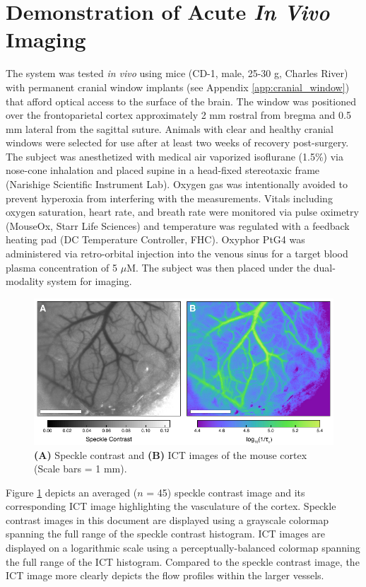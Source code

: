 \section{Demonstration of Acute \textit{In Vivo} Imaging} \label{sec:acutedemo}

The system was tested \textit{in vivo} using mice (CD-1, male, 25-30 g, Charles River) with permanent cranial window implants (see Appendix \ref{app:cranial_window}) that afford optical access to the surface of the brain. The window was positioned over the frontoparietal cortex approximately 2 mm rostral from bregma and 0.5 mm lateral from the sagittal suture. Animals with clear and healthy cranial windows were selected for use after at least two weeks of recovery post-surgery. The subject was anesthetized with medical air vaporized isoflurane (1.5\%) via nose-cone inhalation and placed supine in a head-fixed stereotaxic frame (Narishige Scientific Instrument Lab). Oxygen gas was intentionally avoided to prevent hyperoxia from interfering with the  measurements. Vitals including oxygen saturation, heart rate, and breath rate were monitored via pulse oximetry (MouseOx, Starr Life Sciences) and temperature was regulated with a feedback heating pad (DC Temperature Controller, FHC). Oxyphor PtG4 was administered via retro-orbital injection into the venous sinus for a target blood plasma concentration of 5 $\mu$M. The subject was then placed under the dual-modality system for imaging.

\begin{figure}
    \includegraphics{figures/chapter_2/staticspeckle.pdf}
    \caption{
        \label{fig:staticspeckle}
        \textbf{(A)} Speckle contrast and \textbf{(B)} ICT images of the mouse cortex (Scale bars = 1 mm).
    }
\end{figure}

Figure \ref{fig:staticspeckle} depicts an averaged ($n$ = 45) speckle contrast image and its corresponding ICT image highlighting the vasculature of the cortex. Speckle contrast images in this document are displayed using a grayscale colormap spanning the full range of the speckle contrast histogram. ICT images are displayed on a logarithmic scale using a perceptually-balanced colormap \cite{Niccoli:vx} spanning the full range of the ICT histogram. Compared to the speckle contrast image, the ICT image more clearly depicts the flow profiles within the larger vessels.

